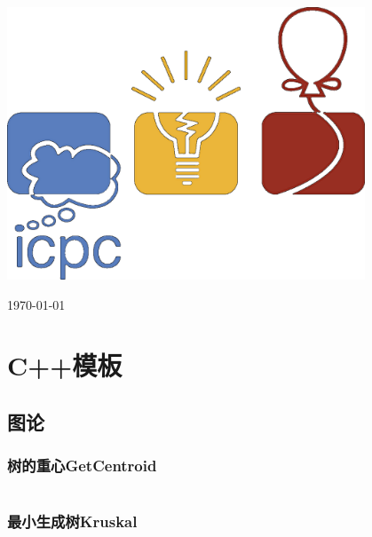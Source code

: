 \documentclass[10pt,a4paper,twoside]{ctexbook}
\renewcommand{\_}{\textscale{1}{\textunderscore}} %
\begin{document}
\begin{titlepage}
    \centering
    \vspace*{2cm}
    
    {\par}
    \vspace{1.5cm}
    
    {\par}
    \vfill

    {\par}
    \vfill
    
    \includegraphics[width=0.8\textwidth]{../Figures/ICPC.png}
    \vfill
    
    {\Large \today \par}
\end{titlepage}

\thispagestyle{empty}

\newpage

\tableofcontents

\newpage
\chapter{C++模板}
\section{图论}
\subsection{树的重心Get\_Centroid}
\inputminted{c++}{../Cpp/图论/树的重心Get_Centroid.cpp}
\subsection{最小生成树Kruskal}
\inputminted{c++}{../Cpp/图论/最小生成树Kruskal.cpp}
\end{document}

